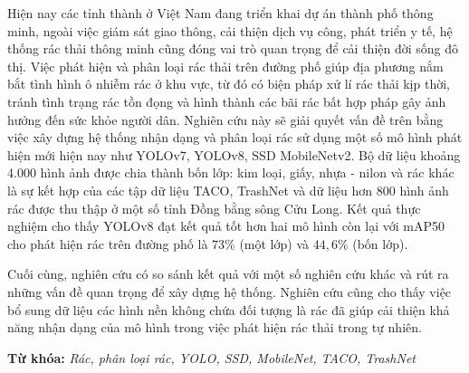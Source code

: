 \documentclass[./thesis.tex]{subfiles}
\begin{document}

{\fontsize{13}{12} \selectfont

Hiện nay các tỉnh thành ở Việt Nam đang triển khai dự án thành phố thông minh, ngoài việc giám sát giao thông, cải thiện dịch vụ công, phát triển y tế, hệ thống rác thải thông minh cũng đóng vai trò quan trọng để cải thiện đời sống đô thị.
Việc phát hiện và phân loại rác thải trên đường phố giúp địa phương nắm bắt tình hình ô nhiễm rác ở khu vực, từ đó có biện pháp xử lí rác thải kịp thời, tránh tình trạng rác tồn đọng và hình thành các bãi rác bất hợp pháp gây ảnh hưởng đến sức khỏe người dân.
Nghiên cứu này sẽ giải quyết vấn đề trên bằng việc xây dựng hệ thống nhận dạng và phân loại rác sử dụng một số mô hình phát hiện mới hiện nay như YOLOv7, YOLOv8, SSD MobileNetv2.
Bộ dữ liệu khoảng 4.000 hình ảnh được chia thành bốn lớp: kim loại, giấy, nhựa - nilon và rác khác là sự kết hợp của các tập dữ liệu TACO, TrashNet và dữ liệu hơn 800 hình ảnh rác được thu thập ở một số tỉnh Đồng bằng sông Cửu Long.
Kết quả thực nghiệm cho thấy YOLOv8 đạt kết quả tốt hơn hai mô hình còn lại với mAP50 cho phát hiện rác trên đường phố là $73\%$ (một lớp) và $44,6\%$ (bốn lớp).

}

\bigskip

{\fontsize{13}{12} \selectfont
Cuối cùng, nghiên cứu có so sánh kết quả với một số nghiên cứu khác và rút ra những vấn đề quan trọng để xây dựng hệ thống.
Nghiên cứu cũng cho thấy việc bổ sung dữ liệu các hình nền không chứa đối tượng là rác đã giúp cải thiện khả năng nhận dạng của mô hình trong việc phát hiện rác thải trong tự nhiên.

}
\bigskip



{\bf Từ khóa:} \textit{Rác, phân loại rác, YOLO, SSD, MobileNet, TACO, TrashNet}
\end{document}
